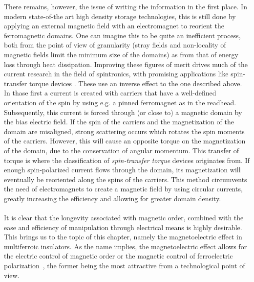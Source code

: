 There remains, however, the issue of writing the information in the first place.
In modern state-of-the art high density storage technologies, this is still done by applying an external magnetic field with an electromagnet to reorient the ferromagnetic domains. One can imagine this to be quite an inefficient process, both from the point of view of granularity (stray fields and non-locality of magnetic fields limit the minimum size of the domains) as from that of energy loss through heat dissipation.
Improving these figures of merit drives much of the current research in the field of spintronics, with promising applications like spin-transfer torque devices \cite{Nunez2006TheorySemiconductors,Nunez2006TheoryMetals,Nunez2011, Kent2015, Jungwirth2016}.
These use an inverse effect to the one described above.
In thase first a current is created with carriers that have a well-defined orientation of the spin by using e.g. a pinned ferromagnet as in the readhead.
Subsequently, this current is forced through (or close to) a magnetic domain by the bias electric field.
If the spin of the carriers and the magnetization of the domain are misaligned, strong scattering occurs which rotates the spin moments of the carriers.
However, this will cause an opposite torque on the magnetization of the domain, due to the conservation of angular momentum. This transfer of torque is where the classification of {\it spin-transfer torque} devices originates from.
If enough spin-polarized current flows through the domain, its magnetization will eventually be reoriented along the spins of the carriers. This method circumvents the need of electromagnets to create a magnetic field by using circular currents, greatly increasing the efficiency and allowing for greater domain density.
\\\\
It is clear that the longevity associated with magnetic order, combined with the ease and efficiency of manipulation through electrical means is highly desirable.
This brings us to the topic of this chapter, namely the magnetoelectric effect in multiferroic insulators.
As the name implies, the magnetoelectric effect allows for the electric control of magnetic order or the magnetic control of ferroelectric polarization~\cite{Spaldin2019,Khomskii2009,Fiebig2005,Fiebig2016,Cheong2007}, the former being the most attractive from a technological point of view.


